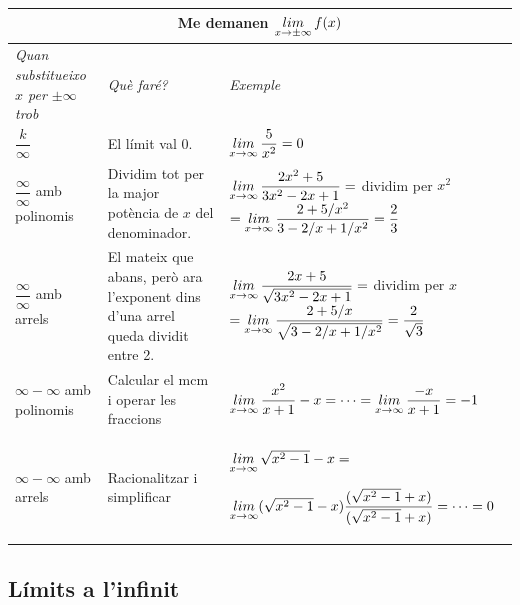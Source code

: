  \begin{center}
 	\setlength\LTleft{0pt}
 	\setlength\LTright{0pt}
 	\fontsize{10.5}{11}
 	\def\arraystretch{1.8}
 	\begin{longtable}[h]{|p{}|p{}|p{}|}
 		\hline
 		\multicolumn{3}{|c|}{Me demanen $\mathop{lim}\limits_{x\to \pm \infty} f(x)$} \\  [1.5ex] \hline  
 		\cellcolor{lightgray}\textit{Quan substitueixo $x$ per $\pm \infty$ trob}  & \cellcolor{lightgray}\textit{Què faré?} & \cellcolor{lightgray}\textit{Exemple}\\  [1.5ex] \hline  
 		$\dfrac{k}{\infty}$ & El límit val 0. & $\mathop{lim}\limits_{x\to \infty} \dfrac{5}{x^2}=0$\\  [1.5ex] \hline  
 		$\dfrac{\infty}{\infty}$ amb polinomis & Dividim tot per la major potència de $x$ del denominador. & $\mathop{lim}\limits_{x\to \infty} \dfrac{2x^2+5}{3x^2-2x+1}=$ dividim per $x^2$ $=\mathop{lim}\limits_{x\to \infty} \dfrac{2+5/x^2}{3-2/x+1/x^2}=\dfrac{2}{3}$\\  [1.5ex] \hline  
 		$\dfrac{\infty}{\infty}$  amb arrels & El mateix que abans, però ara l'exponent dins d'una arrel queda dividit entre 2. & $\mathop{lim}\limits_{x\to \infty} \dfrac{2x+5}{\sqrt{3x^2-2x+1}}=$ dividim per $x$ $=\mathop{lim}\limits_{x\to \infty} \dfrac{2+5/x}{\sqrt{3-2/x+1/x^2}}=\dfrac{2}{\sqrt{3}}$\\  [1.5ex] \hline  
 		$\infty - \infty$  amb polinomis & Calcular el mcm i operar les fraccions & $\mathop{lim}\limits_{x\to \infty} \dfrac{x^2}{x+1}-x=\cdots=\mathop{lim}\limits_{x\to \infty} \dfrac{-x}{x+1}=-1$\\  [1.5ex] \hline  
 		$\infty - \infty$  amb arrels & Racionalitzar i simplificar & $\mathop{lim}\limits_{x\to \infty} \sqrt{x^2-1}-x=$ 
 		
 		$\mathop{lim}\limits_{x\to \infty} (\sqrt{x^2-1}-x)\dfrac{(\sqrt{x^2-1}+x)}{(\sqrt{x^2-1}+x)}=\cdots=0$ \\[1.5ex] \hline  
 	\end{longtable}
 \end{center}

 \pagebreak
\subsection{Límits a l'infinit}


\begin{theorybox}
	\begin{minipage}{0.5\textwidth}
		\centering
	\end{minipage}
	\begin{minipage}{0.5\textwidth}
		\centering
	\end{minipage}
	
	
\end{theorybox}

